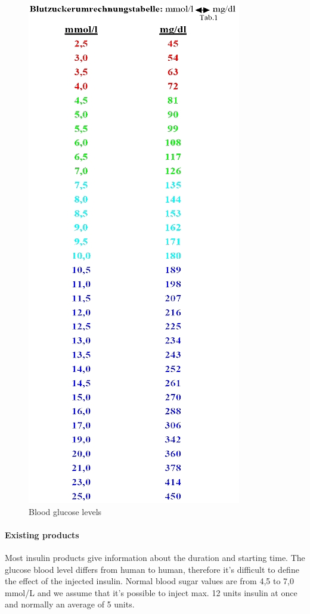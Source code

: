 \documentclass[pdflatex,a4paper,11pt,english]{scrreprt}
\begin{document}
\begin{figure}[htb]
\centering
\includegraphics[scale=0.6]{images/Conversion}
\caption{Blood glucose levels}
\end{figure}

\paragraph{Existing products} 
Most insulin products give information about the duration and starting time. The glucose blood level differs from human to human, therefore it's difficult to define the effect of the injected insulin. 
Normal blood sugar values are from 4,5 to 7,0 mmol/L and we assume that it's possible to inject max. 12 units insulin at once and normally an average of 5 units.\\
\end{document}
